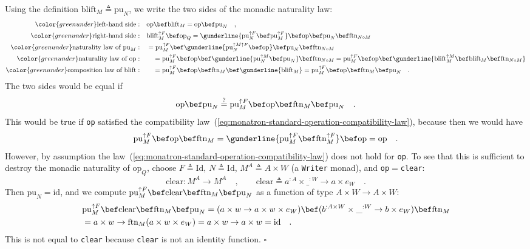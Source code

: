 Using the definition $\text{blift}_{M}\triangleq\text{pu}_{N}$, we
write the two sides of the monadic naturality law:
\begin{align*}
{\color{greenunder}\text{left-hand side}:}\quad & \text{op}\bef\text{blift}_{M}=\text{op}\bef\text{pu}_{N}\quad,\\
{\color{greenunder}\text{right-hand side}:}\quad & \text{blift}_{M}^{\uparrow F}\bef\text{op}_{Q}=\gunderline{\text{pu}_{N}^{\uparrow F}\bef\text{pu}_{M}^{\uparrow F}}\bef\text{op}\bef\text{pu}_{N}\bef\text{ftn}_{N\circ M}\\
{\color{greenunder}\text{naturality law of }\text{pu}_{M}:}\quad & =\text{pu}_{M}^{\uparrow F}\bef\gunderline{\text{pu}_{N}^{\uparrow M\uparrow F}\bef\text{op}}\bef\text{pu}_{N}\bef\text{ftn}_{N\circ M}\\
{\color{greenunder}\text{naturality law of }\text{op}:}\quad & \quad=\text{pu}_{M}^{\uparrow F}\bef\text{op}\bef\gunderline{\text{pu}_{N}^{\uparrow M}\bef\text{pu}_{N}}\bef\text{ftn}_{N\circ M}=\text{pu}_{M}^{\uparrow F}\bef\text{op}\bef\gunderline{\text{blift}_{M}^{\uparrow M}\bef\text{blift}_{M}\bef\text{ftn}_{N\circ M}}\\
{\color{greenunder}\text{composition law of }\text{blift}:}\quad & \quad=\text{pu}_{M}^{\uparrow F}\bef\text{op}\bef\text{ftn}_{M}\bef\gunderline{\text{blift}_{M}}=\text{pu}_{M}^{\uparrow F}\bef\text{op}\bef\text{ftn}_{M}\bef\text{pu}_{N}\quad.
\end{align*}
The two sides would be equal if
\[
\text{op}\bef\text{pu}_{N}\overset{?}{=}\text{pu}_{M}^{\uparrow F}\bef\text{op}\bef\text{ftn}_{M}\bef\text{pu}_{N}\quad.
\]
This would be true if \lstinline!op! satisfied the compatibility
law~(\ref{eq:monatron-standard-operation-compatibility-law}), because
then we would have
\[
\text{pu}_{M}^{\uparrow F}\bef\text{op}\bef\text{ftn}_{M}=\gunderline{\text{pu}_{M}^{\uparrow F}\bef\text{ftn}_{M}^{\uparrow F}}\bef\text{op}=\text{op}\quad.
\]
However, by assumption the law~(\ref{eq:monatron-standard-operation-compatibility-law})
does not hold for \lstinline!op!. To see that this is sufficient
to destroy the monadic naturality of $\text{op}_{Q}$, choose $F\triangleq\text{Id}$,
$N\triangleq\text{Id}$, $M^{A}\triangleq A\times W$ (a \lstinline!Writer!
monad), and \lstinline!op!$=$\lstinline!clear!:
\[
\text{clear}:M^{A}\rightarrow M^{A}\quad,\quad\quad\text{clear}\triangleq a^{:A}\times\_^{:W}\rightarrow a\times e_{W}\quad.
\]
Then $\text{pu}_{N}=\text{id}$, and we compute $\text{pu}_{M}^{\uparrow F}\bef\text{clear}\bef\text{ftn}_{M}\bef\text{pu}_{N}$
as a function of type $A\times W\rightarrow A\times W$:
\begin{align*}
 & \text{pu}_{M}^{\uparrow F}\bef\text{clear}\bef\text{ftn}_{M}\bef\text{pu}_{N}=(a\times w\rightarrow a\times w\times e_{W})\bef(b^{:A\times W}\times\_^{:W}\rightarrow b\times e_{W})\bef\text{ftn}_{M}\\
 & =a\times w\rightarrow\text{ftn}_{M}(a\times w\times e_{W})=a\times w\rightarrow a\times w=\text{id}\quad.
\end{align*}
This is not equal to \lstinline!clear! because \lstinline!clear!
is not an identity function. $\square$

